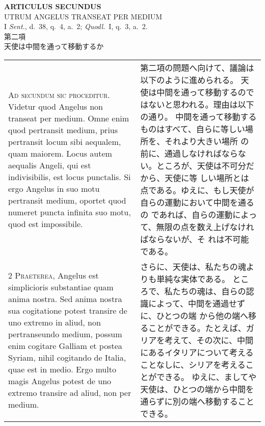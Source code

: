 \documentclass[10pt]{jsarticle} %
\begin{document}
\newpage

\begin{center}
 {\Large {\bf ARTICULUS SECUNDUS}}\\
 {\large UTRUM ANGELUS TRANSEAT PER MEDIUM}\\
 {\footnotesize I {\itshape Sent.}, d.~38, q.~4, a.~2; {\itshape
 Quodl.}~I, q.~3, a.~2.}\\
 {\Large 第二項\\天使は中間を通って移動するか}
\end{center}

\begin{longtable}{p{21em}p{21em}}

{\huge A}{\scshape d secundum sic proceditur}. Videtur quod
Angelus non transeat per medium. Omne enim quod pertransit medium, prius
pertransit locum sibi aequalem, quam maiorem. Locus autem aequalis
Angeli, qui est indivisibilis, est locus punctalis. Si ergo Angelus in
suo motu pertransit medium, oportet quod numeret puncta infinita suo
motu, quod est impossibile.

&

第二項の問題へ向けて、議論は以下のように進められる。
天使は中間を通って移動するのではないと思われる。理由は以下の通り。
中間を通って移動するものはすべて、自らに等しい場所を、それより大きい場所
 の前に、通過しなければならない。ところが、天使は不可分だから、天使に等
 しい場所とは点である。ゆえに、もし天使が自らの運動において中間を通るの
 であれば、自らの運動によって、無限の点を数え上げなければならないが、そ
 れは不可能である。

\\


{\scshape 2 Praeterea}, Angelus est simplicioris
substantiae quam anima nostra. Sed anima nostra sua cogitatione potest
transire de uno extremo in aliud, non pertranseundo medium, possum enim
cogitare Galliam et postea Syriam, nihil cogitando de Italia, quae est
in medio. Ergo multo magis Angelus potest de uno extremo transire ad
aliud, non per medium.

&

さらに、天使は、私たちの魂よりも単純な実体である。
ところで、私たちの魂は、自らの認識によって、中間を通過せずに、ひとつの端
 から他の端へ移ることができる。たとえば、ガリアを考えて、その次に、中間
 にあるイタリアについて考えることなしに、シリアを考えることができる。
ゆえに、ましてや天使は、ひとつの端から中間を通らずに別の端へ移動すること
 できる。


\\



\end{longtable}
\end{document}
